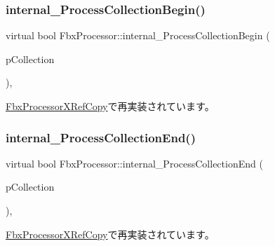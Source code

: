 \subsubsection{\texorpdfstring{internal\+\_\+\+Process\+Collection\+Begin()}{internal\_ProcessCollectionBegin()}}
{\footnotesize\ttfamily virtual bool Fbx\+Processor\+::internal\+\_\+\+Process\+Collection\+Begin (\begin{DoxyParamCaption}\item[{\hyperlink{class_fbx_collection}{Fbx\+Collection} $\ast$}]{p\+Collection }\end{DoxyParamCaption})\hspace{0.3cm}{\ttfamily [protected]}, {\ttfamily [virtual]}}



\hyperlink{class_fbx_processor_x_ref_copy_ada78e119a176edb65c40cbb787699d83}{Fbx\+Processor\+X\+Ref\+Copy}で再実装されています。

\mbox{\label{class_fbx_processor_ae578a3b99db2133b967b0ed29ce37e96}} 
\subsubsection{\texorpdfstring{internal\+\_\+\+Process\+Collection\+End()}{internal\_ProcessCollectionEnd()}}
{\footnotesize\ttfamily virtual bool Fbx\+Processor\+::internal\+\_\+\+Process\+Collection\+End (\begin{DoxyParamCaption}\item[{\hyperlink{class_fbx_collection}{Fbx\+Collection} $\ast$}]{p\+Collection }\end{DoxyParamCaption})\hspace{0.3cm}{\ttfamily [protected]}, {\ttfamily [virtual]}}



\hyperlink{class_fbx_processor_x_ref_copy_ab85bf2d36c443dff93731836493cdfdf}{Fbx\+Processor\+X\+Ref\+Copy}で再実装されています。

\mbox{\label{class_fbx_processor_ac549e7e8c678383831be8789a7c4ccdb}} 
